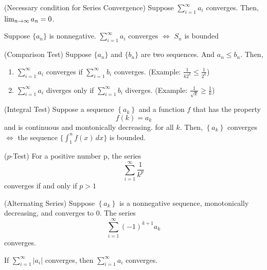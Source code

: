 \documentclass{article}
\begin{document}
\def\series{\sum_{i=1}^\infty a_i}

\begin{theorem}
    (Necessary condition for Series Convergence)
    Suppose $\series$ converges. Then, $\lim_{n \to \infty} a_n = 0$.
\end{theorem}

\begin{theorem}
    Suppose $\{a_n\}$ is nonnegative. $\series$ converges $\Longleftrightarrow$
    $S_n$ is bounded
\end{theorem}

\begin{theorem}
    (Comparison Test)
    Suppose $\{a_n\}$ and $\{b_n\}$ are two sequences. And $a_n\leq b_n$. Then,
    \begin{enumerate}
        \item $\series$ converges if $\sum_{i=1}^\infty b_i$ converges.
        (Example: $\frac{1}{k2^k} \leq \frac{1}{2^k}$)
        \item $\series$ diverges only if $\sum_{i=1}^\infty b_i$ diverges.
        (Example: $\frac{1}{\sqrt{k}}\geq \frac{1}{k}$)
    \end{enumerate}
\end{theorem}

\begin{theorem}
    (Integral Test)
    Suppose a sequence $\left\{ a_k \right\}$ and a function $f$ that has the property
    \[ f(k) = a_k \]  and is continuous and montonically decreasing.
    for all $k$. Then, $\left\{ a_k \right\}$ converges $\Longleftrightarrow$
    the sequence $\{\int_1^n f(x)\, dx\}$ is bounded. 
\end{theorem}

\begin{theorem}
    ($p$-Test)
    For a positive number p, the series
    \[ \sum_{i=1}^\infty \frac{1}{k^p} \]
    converges if and only if $p>1$
\end{theorem}

\begin{theorem}
    (Alternating Series)
    Suppose $\left\{ a_k \right\}$ is a nonnegative sequence, monotonically
    decreasing, and converges to 0. The series
    \[ \sum_{i=1}^\infty (-1)^{k+1}a_k \]
    converges.
\end{theorem}

\begin{theorem}
    If $\sum_{i=1}^\infty |a_i|$ converges, then $\series$ converges.
\end{theorem}
\end{document}
